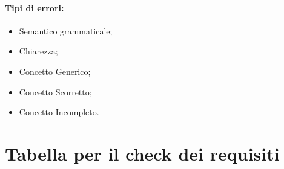 \subsubsection{Tipi di errori:}

\begin{itemize}
\item Semantico grammaticale;
\item Chiarezza;
\item Concetto Generico;
\item Concetto Scorretto;
\item Concetto Incompleto.
\end{itemize}

\chapter{Tabella per il check dei requisiti}

